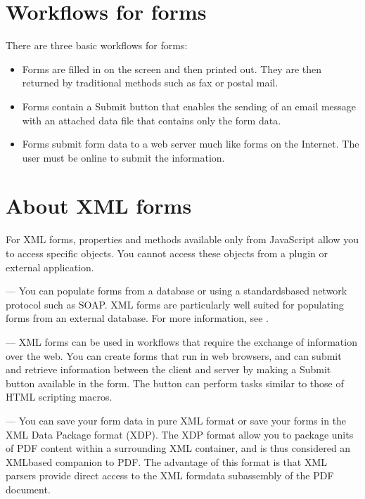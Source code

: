 \documentclass[letterpaper,12pt,english,openany,oneside]{sphinxmanual}
\begin{document}
\section{Workflows for forms}
\label{\detokenize{Overview_Forms:workflows-for-forms}}
There are three basic workflows for forms:
\begin{itemize}
\item {} 
Forms are filled in on the screen and then printed out. They are then returned by traditional methods such as fax or postal mail.

\item {} 
Forms contain a Submit button that enables the sending of an email message with an attached data file that contains only the form data.

\item {} 
Forms submit form data to a web server much like forms on the Internet. The user must be online to submit the information.

\end{itemize}




\section{About XML forms}
\label{\detokenize{Overview_Forms:about-xml-forms}}
For XML forms, properties and methods available only from JavaScript allow you to access specific objects. You cannot access these objects from a plug\sphinxhyphen{}in or external application.

 — You can populate forms from a database or using a standards\sphinxhyphen{}based network protocol such as SOAP. XML forms are particularly well suited for populating forms from an external database. For more information, see .

 — XML forms can be used in workflows that require the exchange of information over the web. You can create forms that run in web browsers, and can submit and retrieve information between the client and server by making a Submit button available in the form. The button can perform tasks similar to those of HTML scripting macros.

 — You can save your form data in pure XML format or save your forms in the XML Data Package format (XDP). The XDP format allow you to package units of PDF content within a surrounding XML container, and is thus considered an XML\sphinxhyphen{}based companion to PDF. The advantage of this format is that XML parsers provide direct access to the XML form\sphinxhyphen{}data subassembly of the PDF document.
\end{document}
